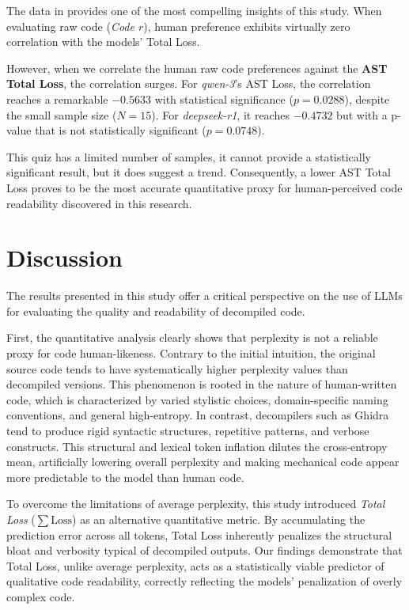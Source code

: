 The data in  provides one of the most compelling insights of this study. When evaluating raw code (\emph{Code $r$}), human preference exhibits virtually zero correlation with the models' Total Loss.

However, when we correlate the human raw code preferences against the \textbf{\ac{AST} Total Loss}, the correlation surges. For \emph{qwen-3}'s AST Loss, the correlation reaches a remarkable $-0.5633$ with statistical significance ($p = 0.0288$), despite the small sample size ($N=15$). For \emph{deepseek-r1}, it reaches $-0.4732$ but with a p-value that is not statistically significant ($p = 0.0748$).

This quiz has a limited number of samples, it cannot provide a statistically significant result, but it does suggest a trend. Consequently, a lower \ac{AST} Total Loss proves to be the most accurate quantitative proxy for human-perceived code readability discovered in this research.
\section{Discussion}

The results presented in this study offer a critical perspective on the use of \acp{LLM} for evaluating the quality and readability of decompiled code.

First, the quantitative analysis clearly shows that perplexity is not a reliable proxy for code human-likeness. Contrary to the initial intuition, the original source code tends to have systematically higher perplexity values than decompiled versions. This phenomenon is rooted in the nature of human-written code, which is characterized by varied stylistic choices, domain-specific naming conventions, and general high-entropy. In contrast, decompilers such as Ghidra tend to produce rigid syntactic structures, repetitive patterns, and verbose constructs. This structural and lexical token inflation dilutes the cross-entropy mean, artificially lowering overall perplexity and making mechanical code appear more predictable to the model than human code.

To overcome the limitations of average perplexity, this study introduced \emph{Total Loss} ($\sum \mathrm{Loss}$) as an alternative quantitative metric. By accumulating the prediction error across all tokens, Total Loss inherently penalizes the structural bloat and verbosity typical of decompiled outputs. Our findings demonstrate that Total Loss, unlike average perplexity, acts as a statistically viable predictor of qualitative code readability, correctly reflecting the models' penalization of overly complex code.


